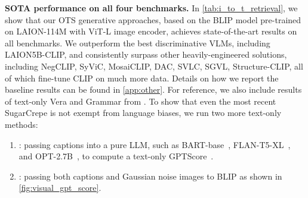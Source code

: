 \documentclass{article} \usepackage{iclr2024_conference,times}
\begin{document}
{\bf SOTA performance on all four benchmarks. } In \autoref{tab:i_to_t_retrieval}, we show that our OTS generative approaches, based on the BLIP model pre-trained on LAION-114M with ViT-L image encoder, achieves state-of-the-art results on all benchmarks. We outperform the best discriminative VLMs, including LAION5B-CLIP, and consistently surpass other heavily-engineered solutions, including NegCLIP, SyViC, MosaiCLIP, DAC, SVLC, SGVL, Structure-CLIP, all of which fine-tune CLIP on much more data. Details on how we report the baseline results can be found in \autoref{app:other}. For reference, we also include results of text-only Vera and Grammar from \citet{sugarcrepe}. To show that even the most recent SugarCrepe is not exempt from language biases, we run two more text-only methods:
\begin{enumerate}
    \item : passing captions into a pure LLM, such as BART-base~\citep{bartscore}, FLAN-T5-XL~\citep{flan}, and OPT-2.7B~\citep{opt}, to compute a text-only GPTScore~\citep{fu2023gptscore}.
    \item : passing both captions and Gaussian noise images to BLIP as shown in \autoref{fig:visual_gpt_score}.
\end{enumerate}
\end{document}
